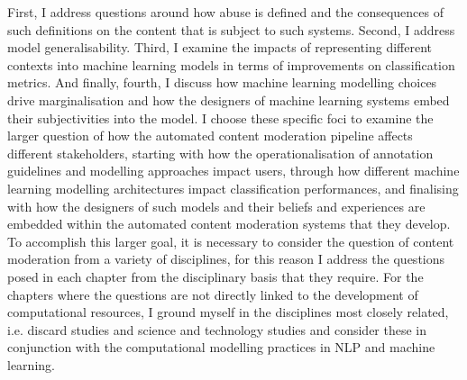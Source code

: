 First, I address questions around how abuse is defined and the consequences of such definitions on the content that is subject to such systems.
Second, I address model generalisability.
Third, I examine the impacts of representing different contexts into machine learning models in terms of improvements on classification metrics.
And finally, fourth, I discuss how machine learning modelling choices drive marginalisation and how the designers of machine learning systems embed their subjectivities into the model.
I choose these specific foci to examine the larger question of how the automated content moderation pipeline affects different stakeholders, starting with how the operationalisation of annotation guidelines and modelling approaches impact users, through how different machine learning modelling architectures impact classification performances, and finalising with how the designers of such models and their beliefs and experiences are embedded within the automated content moderation systems that they develop.
To accomplish this larger goal, it is necessary to consider the question of content moderation from a variety of disciplines, for this reason I address the questions posed in each chapter from the disciplinary basis that they require.
For the chapters where the questions are not directly linked to the development of computational resources, I ground myself in the disciplines most closely related, i.e. discard studies and science and technology studies and consider these in conjunction with the computational modelling practices in NLP and machine learning.

